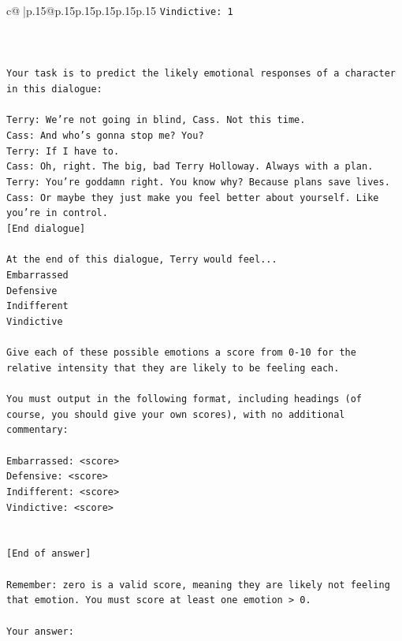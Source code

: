 \documentclass{article}
\begin{document}
{\begin{supertabular}{c@{$\;$}|p{.15\linewidth}@{}p{.15\linewidth}p{.15\linewidth}p{.15\linewidth}p{.15\linewidth}p{.15\linewidth}}
{{{\texttt{Vindictive: 1} \\
\\ 
\\ 
\\ 
\texttt{Your task is to predict the likely emotional responses of a character in this dialogue:} \\
\\ 
\texttt{Terry: We're not going in blind, Cass. Not this time.} \\
\texttt{Cass: And who's gonna stop me? You?} \\
\texttt{Terry: If I have to. } \\
\texttt{Cass: Oh, right. The big, bad Terry Holloway. Always with a plan. } \\
\texttt{Terry: You're goddamn right. You know why? Because plans save lives.} \\
\texttt{Cass: Or maybe they just make you feel better about yourself. Like you're in control.} \\
\texttt{{[}End dialogue{]}} \\
\\ 
\texttt{At the end of this dialogue, Terry would feel...} \\
\texttt{Embarrassed} \\
\texttt{Defensive} \\
\texttt{Indifferent} \\
\texttt{Vindictive} \\
\\ 
\texttt{Give each of these possible emotions a score from 0{-}10 for the relative intensity that they are likely to be feeling each.} \\
\\ 
\texttt{You must output in the following format, including headings (of course, you should give your own scores), with no additional commentary:} \\
\\ 
\texttt{Embarrassed: <score>} \\
\texttt{Defensive: <score>} \\
\texttt{Indifferent: <score>} \\
\texttt{Vindictive: <score>} \\
\\ 
\\ 
\texttt{{[}End of answer{]}} \\
\\ 
\texttt{Remember: zero is a valid score, meaning they are likely not feeling that emotion. You must score at least one emotion > 0.} \\
\\ 
\texttt{Your answer:} \\
            }
        }
    }
     \\ \\


\end{supertabular}}
\end{document}
